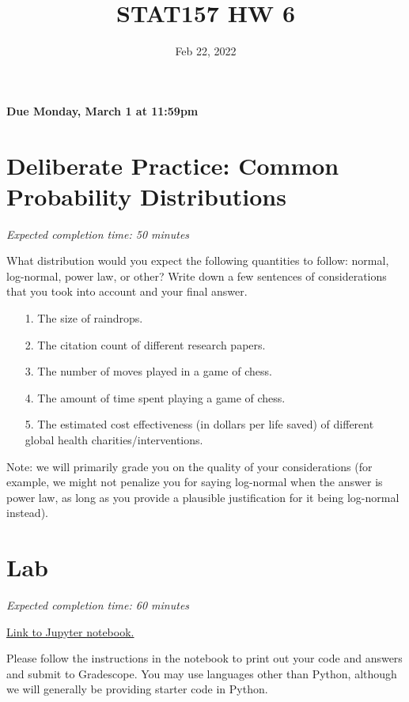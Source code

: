 \documentclass[11pt]{article}
\title{STAT157 HW 6}
\date{Feb 22, 2022}
\begin{document}
\maketitle

\hfill \textbf{Due Monday, March 1 at 11:59pm}

\section*{Deliberate Practice: Common Probability Distributions}

\emph{Expected completion time: 50 minutes}

What distribution would you expect the following quantities to follow: normal, log-normal, power law, or other? Write down a few sentences of considerations that you took into account and your final answer. 

\begin{enumerate}
	\item[1.] The size of raindrops.
	\item[2.] The citation count of different research papers.
	\item[3.] The number of moves played in a game of chess.
	\item[4.] The amount of time spent playing a game of chess.
	\item[5.] The estimated cost effectiveness (in dollars per life saved) of different global health charities/interventions.
\end{enumerate}

Note: we will primarily grade you on the quality of your considerations (for example, we might not penalize you for saying log-normal when the answer is power law, as long as you provide a plausible justification for it being log-normal instead).

\section*{Lab}

\emph{Expected completion time: 60 minutes}

\href{https://datahub.berkeley.edu/hub/user-redirect/git-pull?repo=https%3A%2F%2Fgithub.com%2Fjs-d%2Fstat-157-260-website&urlpath=tree%2Fstat-157-260-website%2Fhw%2Fhw6%2Fhw6lab.ipynb&branch=main}{Link to Jupyter notebook.}

Please follow the instructions in the notebook to print out your code and answers and submit to Gradescope. You may use languages other than Python, although we will generally be providing starter code in Python.
\end{document}

